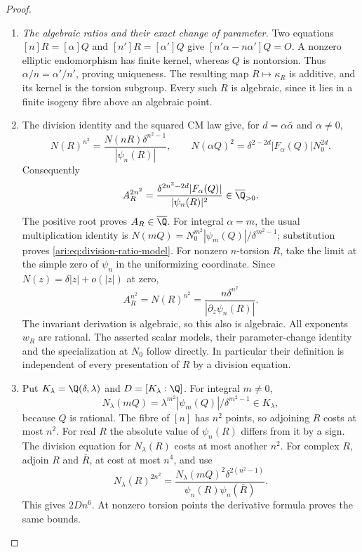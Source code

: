 \begin{proof}
\begin{enumerate}[label=\arabic*.,leftmargin=*]
\item \emph{The algebraic ratios and their exact change of parameter.}
Two equations $[n]R=[\alpha]Q$ and $[n']R=[\alpha']Q$
give $[n'\alpha-n\alpha']Q=O$. A nonzero elliptic endomorphism
has finite kernel, whereas $Q$ is nontorsion. Thus
$\alpha/n=\alpha'/n'$, proving uniqueness. The resulting
map $R\mapsto\kappa_R$ is additive, and its kernel is the
torsion subgroup. Every such $R$ is algebraic, since it lies
in a finite isogeny fibre above an algebraic point.

\item The division identity and the squared CM law give, for
$d=\alpha\bar\alpha$ and $\alpha\ne0$,
\[
 N(R)^{n^2}=\frac{N(nR)\delta^{n^2-1}}{|\psi_n(R)|},
 \qquad
 N(\alpha Q)^2=\delta^{2-2d}|F_\alpha(Q)|N_0^{2d}.
\]
Consequently
\[
 A_R^{2n^2}=\frac{\delta^{2n^2-2d}|F_\alpha(Q)|}
                         {|\psi_n(R)|^2}\in\overline\Q_{>0}.
\]
The positive root proves $A_R\in\overline\Q$. For integral
$\alpha=m$, the usual multiplication identity is
$N(mQ)=N_0^{m^2}|\psi_m(Q)|/\delta^{m^2-1}$;
substitution proves \eqref{ari:eq:division-ratio-model}.
For nonzero $n$-torsion $R$, take the limit at the simple zero
of $\psi_n$ in the uniformizing coordinate. Since
$N(z)=\delta|z|+o(|z|)$ at zero,
\[
 A_R^{n^2}=N(R)^{n^2}
       =\frac{n\delta^{n^2}}{|\partial_z\psi_n(R)|}.
\]
The invariant derivation is algebraic, so this also is algebraic.
All exponents $w_R$ are rational. The asserted scalar models,
their parameter-change identity and the specialization at $N_0$
follow directly. In particular their definition is independent
of every presentation of $R$ by a division equation.

\item Put $K_\lambda=\Q(\delta,\lambda)$ and
$D=[K_\lambda:\Q]$. For integral $m\ne0$,
\[
 N_\lambda(mQ)=\lambda^{m^2}
                     |\psi_m(Q)|/\delta^{m^2-1}\in K_\lambda,
\]
because $Q$ is rational. The fibre of $[n]$ has $n^2$ points,
so adjoining $R$ costs at most $n^2$. For real $R$ the absolute
value of $\psi_n(R)$ differs from it by a sign. The division
equation for $N_\lambda(R)$ costs at most another $n^2$.
For complex $R$, adjoin $R$ and $\bar R$, at cost at most
$n^4$, and use
\[
 N_\lambda(R)^{2n^2}
 =\frac{N_\lambda(mQ)^2\delta^{2(n^2-1)}}
              {\psi_n(R)\psi_n(\bar R)}.
\]
This gives $2Dn^6$. At nonzero torsion points the derivative
formula proves the same bounds.


\end{enumerate}
\end{proof}
